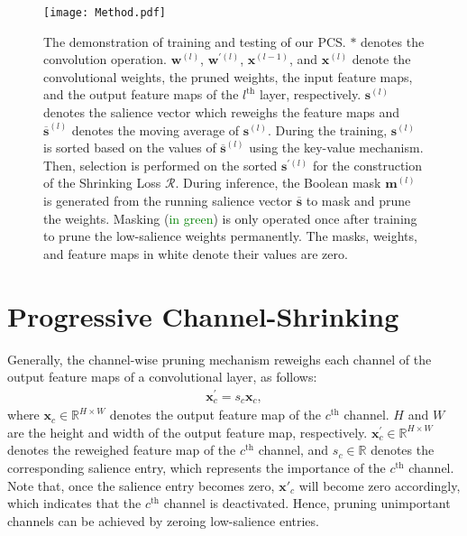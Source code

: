\documentclass[lettersize,journal]{IEEEtran}
\begin{document}
\begin{figure*}[t]
  \center
  \texttt{[image: Method.pdf]}  
  \caption{The demonstration of training and testing of our PCS. $*$ denotes the convolution operation. $\boldsymbol{w}^{(l)}$, $\boldsymbol{w}^{\prime(l)}$, $\boldsymbol{x}^{(l-1)}$, and $\boldsymbol{x}^{(l)}$ denote the convolutional weights, the pruned weights, the input feature maps, and the output feature maps of the $l^{\text{th}}$ layer, respectively.
  $\boldsymbol{s}^{(l)}$ denotes the salience vector which reweighs the feature maps and $\overline{\boldsymbol{s}}^{(l)}$ denotes the moving average of $\boldsymbol{s}^{(l)}$. During the training, $\boldsymbol{s}^{(l)}$ is sorted based on the values of $\overline{\boldsymbol{s}}^{(l)}$ using the key-value mechanism. Then, selection is performed on the sorted $\boldsymbol{s}^{\prime (l)}$ for the construction of the Shrinking Loss $\mathcal{R}$. During inference, the Boolean mask $\boldsymbol{m}^{(l)}$ is generated from the running salience vector $\overline{\boldsymbol{s}}$ to mask and prune the weights. 
  Masking (\textcolor{green}{in green}) is only operated once after training to prune the low-salience weights permanently. 
  The masks, weights, and feature maps in white denote their values are zero. }
  \label{PCSConv}
\end{figure*}



\section{Progressive Channel-Shrinking}
\label{Progressive Channel-Shrinking}
Generally, the channel-wise pruning mechanism reweighs each channel of the output feature maps of a convolutional layer, as follows: 
\begin{align}
  \label{eq.attproduct}
  \boldsymbol{x}^{\prime}_{c}=s_{c}\boldsymbol{x}_{c}, 
\end{align}
where $\boldsymbol{x}_{c}\in\mathbb{R}^{H \times W}$ denotes  the output feature map of the $c^{\text{th}}$ channel.  $H$ and $W$ are the height and width of the output feature map, respectively.  $\boldsymbol{x}^{\prime}_{c}\in\mathbb{R}^{H \times W}$ denotes the reweighed feature map of the $c^{\text{th}}$ channel, and $s_{c}\in \mathbb{R}$ denotes the corresponding 
salience entry, which represents the importance of the  $c^{\text{th}}$ channel. 
Note that, once the 
salience entry becomes zero,
$\boldsymbol{x}'_{c}$ will become zero accordingly, which indicates that the $c^{\text{th}}$ channel is deactivated. 
Hence, pruning unimportant channels can be achieved by zeroing low-salience entries. 
\end{document}
